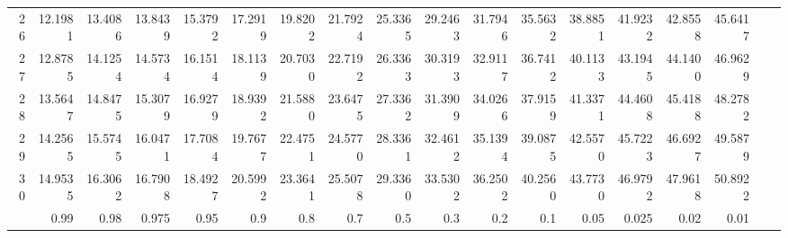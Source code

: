 \begin{table}[ht]
\begin{sideways}
\begin{tabular}{r||rrrrrrrrrrrrrrrrr}
  26 & 12.1981 & 13.4086 & 13.8439 & 15.3792 & 17.2919 & 19.8202 & 21.7924 & 25.3365 & 29.2463 & 31.7946 & 35.5632 & 38.8851 & 41.9232 & 42.8558 & 45.6417 \\ 
  27 & 12.8785 & 14.1254 & 14.5734 & 16.1514 & 18.1139 & 20.7030 & 22.7192 & 26.3363 & 30.3193 & 32.9117 & 36.7412 & 40.1133 & 43.1945 & 44.1400 & 46.9629 \\ 
  28 & 13.5647 & 14.8475 & 15.3079 & 16.9279 & 18.9392 & 21.5880 & 23.6475 & 27.3362 & 31.3909 & 34.0266 & 37.9159 & 41.3371 & 44.4608 & 45.4188 & 48.2782 \\ 
  29 & 14.2565 & 15.5745 & 16.0471 & 17.7084 & 19.7677 & 22.4751 & 24.5770 & 28.3361 & 32.4612 & 35.1394 & 39.0875 & 42.5570 & 45.7223 & 46.6927 & 49.5879 \\ 
  30 & 14.9535 & 16.3062 & 16.7908 & 18.4927 & 20.5992 & 23.3641 & 25.5078 & 29.3360 & 33.5302 & 36.2502 & 40.2560 & 43.7730 & 46.9792 & 47.9618 & 50.8922 \\ 
   \hline
  \hline
 & 0.99 & 0.98 & 0.975 & 0.95 & 0.9 & 0.8 & 0.7 & 0.5 & 0.3 & 0.2 & 0.1 & 0.05 & 0.025 & 0.02 & 0.01 \\ 
  \cline{2-16}
\end{tabular}
\end{sideways}
\end{table}

